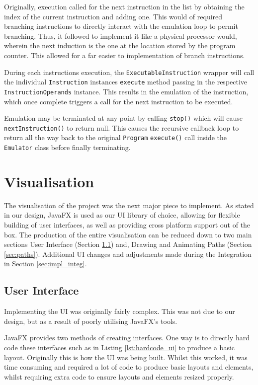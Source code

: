 Originally, execution called for the next instruction in the list by obtaining the index of the current instruction and adding one. This would of required branching instructions to directly interact with the emulation loop to permit branching. Thus, it followed to implement it like a physical processor would, wherein the next induction is the one at the location stored by the program counter. This allowed for a far easier to implementation of branch instructions.

During each instructions execution, the \texttt{ExecutableInstruction} wrapper will call the individual \texttt{Instruction} instances \verb|execute| method passing in the respective \texttt{InstructionOperands} instance. This results in the emulation of the instruction, which once complete triggers a call for the next instruction to be executed.

Emulation may be terminated at any point by calling \verb|stop()| which will cause \verb|nextInstruction()| to return null. This causes the recursive callback loop to return all the way back to the original \texttt{Program} \verb|execute()| call inside the \texttt{Emulator} class before finally terminating.

\section{Visualisation}\label{sec:impl_vis}
The visualisation of the project was the next major piece to implement. As stated in our design, JavaFX \cite{sunmicrosystems_2022_javafx} is used as our \ac{UI} library of choice, allowing for flexible building of user interfaces, as well as providing cross platform support out of the box. The production of the entire visualisation can be reduced down to two main sections User Interface (Section \ref{sec:ui}) and, Drawing and Animating Paths (Section \ref{sec:paths}). Additional \ac{UI} changes and adjustments made during the Integration in Section \ref{sec:impl_integ}.

\subsection{User Interface}\label{sec:ui}
Implementing the \ac{UI} was originally fairly complex. This was not due to our design, but as a result of poorly utilising JavaFX's \cite{sunmicrosystems_2022_javafx} tools. 

JavaFX \cite{sunmicrosystems_2022_javafx} provides two methods of creating interfaces. One way is to directly hard code these interfaces such as in Listing \ref{lst:hardcode_ui} to produce a basic layout. Originally this is how the \ac{UI} was being built. Whilst this worked, it was time consuming and required a lot of code to produce basic layouts and elements, whilst requiring extra code to ensure layouts and elements resized properly.

